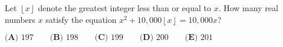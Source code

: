Let $\left\lfloor x\right\rfloor$ denote the greatest integer less than or equal to $x$. How many real numbers $x$ satisfy the equation $x^2+10,000\left\lfloor x\right\rfloor=10,000x$?

$\textbf{(A) }197\qquad\textbf{(B) }198\qquad\textbf{(C) }199\qquad\textbf{(D) }200\qquad\textbf{(E) }201$